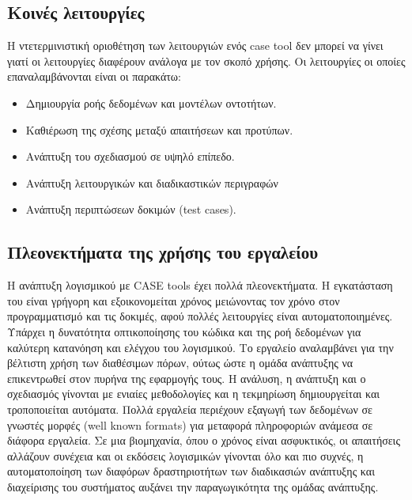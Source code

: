 \subsection{Κοινές λειτουργίες}
Η ντετερμινιστική οριοθέτηση των λειτουργιών ενός case tool δεν μπορεί να γίνει γιατί οι λειτουργίες διαφέρουν ανάλογα με τον σκοπό χρήσης. Οι λειτουργίες οι οποίες επαναλαμβάνονται είναι οι παρακάτω:
\begin{itemize}
	\item Δημιουργία ροής δεδομένων και μοντέλων οντοτήτων.
	\item Καθιέρωση της σχέσης μεταξύ απαιτήσεων και προτύπων.
	\item Ανάπτυξη του σχεδιασμού σε υψηλό επίπεδο.
	\item Ανάπτυξη λειτουργικών και διαδικαστικών περιγραφών
	\item Ανάπτυξη περιπτώσεων δοκιμών (test cases).	
\end{itemize}

\subsection{Πλεονεκτήματα της χρήσης του εργαλείου}
H ανάπτυξη λογισμικού με CASE tools έχει πολλά πλεονεκτήματα. Η εγκατάσταση του είναι γρήγορη και εξοικονομείται χρόνος μειώνοντας τον χρόνο στον προγραμματισμό και τις δοκιμές, αφού πολλές λειτουργίες είναι αυτοματοποιημένες. Υπάρχει η δυνατότητα οπτικοποίησης του κώδικα και της ροή δεδομένων για καλύτερη κατανόηση και ελέγχου του λογισμικού. Το εργαλείο αναλαμβάνει για την βέλτιστη χρήση των διαθέσιμων πόρων, ούτως ώστε η ομάδα ανάπτυξης να επικεντρωθεί στον πυρήνα της εφαρμογής τους. Η ανάλυση, η ανάπτυξη και ο σχεδιασμός γίνονται με ενιαίες μεθοδολογίες και η τεκμηρίωση δημιουργείται και τροποποιείται αυτόματα. Πολλά εργαλεία περιέχουν εξαγωγή των δεδομένων σε γνωστές μορφές (well known formats) για μεταφορά πληροφοριών ανάμεσα σε διάφορα εργαλεία. Σε μια βιομηχανία, όπου ο χρόνος είναι ασφυκτικός, οι απαιτήσεις αλλάζουν συνέχεια και οι εκδόσεις λογισμικών γίνονται όλο και πιο συχνές, η αυτοματοποίηση των διαφόρων δραστηριοτήτων των διαδικασιών ανάπτυξης και διαχείρισης του συστήματος αυξάνει την παραγωγικότητα της ομάδας ανάπτυξης.

